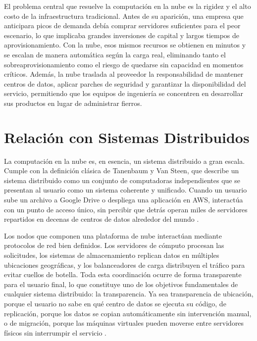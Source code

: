 \documentclass[letterpaper,11pt]{article}
\begin{document}
    El problema central que resuelve la computación en la nube es la rigidez y el alto costo de la infraestructura tradicional. Antes de su aparición, una empresa que anticipara picos de demanda debía comprar servidores suficientes para el peor escenario, lo que implicaba grandes inversiones de capital y largos tiempos de aprovisionamiento. Con la nube, esos mismos recursos se obtienen en minutos y se escalan de manera automática según la carga real, eliminando tanto el sobreaprovisionamiento como el riesgo de quedarse sin capacidad en momentos críticos. Además, la nube traslada al proveedor la responsabilidad de mantener centros de datos, aplicar parches de seguridad y garantizar la disponibilidad del servicio, permitiendo que los equipos de ingeniería se concentren en desarrollar sus productos en lugar de administrar fierros.

    \newpage
    \section{Relación con Sistemas Distribuidos}

    La computación en la nube es, en esencia, un sistema distribuido a gran escala. Cumple con la definición clásica de Tanenbaum y Van Steen, que describe un sistema distribuido como un conjunto de computadoras independientes que se presentan al usuario como un sistema coherente y unificado. Cuando un usuario sube un archivo a Google Drive o despliega una aplicación en AWS, interactúa con un punto de acceso único, sin percibir que detrás operan miles de servidores repartidos en decenas de centros de datos alrededor del mundo \parencite{splunk-distributed}.

    Los nodos que componen una plataforma de nube interactúan mediante protocolos de red bien definidos. Los servidores de cómputo procesan las solicitudes, los sistemas de almacenamiento replican datos en múltiples ubicaciones geográficas, y los balanceadores de carga distribuyen el tráfico para evitar cuellos de botella. Toda esta coordinación ocurre de forma transparente para el usuario final, lo que constituye uno de los objetivos fundamentales de cualquier sistema distribuido: la transparencia. Ya sea transparencia de ubicación, porque el usuario no sabe en qué centro de datos se ejecuta su código, de replicación, porque los datos se copian automáticamente sin intervención manual, o de migración, porque las máquinas virtuales pueden moverse entre servidores físicos sin interrumpir el servicio \parencite{researchgate-scalability}.
\end{document}
